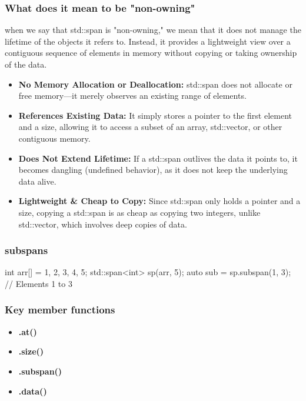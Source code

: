 \documentclass{report}
\begin{document}
         \subsubsection{What does it mean to be "non-owning"}
         \bigbreak \noindent 
         when we say that std::span is "non-owning," we mean that it does not manage the lifetime of the objects it refers to. Instead, it provides a lightweight view over a contiguous sequence of elements in memory without copying or taking ownership of the data.
         \bigbreak \noindent 
         \begin{itemize}
             \item \textbf{No Memory Allocation or Deallocation:} std::span does not allocate or free memory—it merely observes an existing range of elements.
             \item \textbf{References Existing Data:} It simply stores a pointer to the first element and a size, allowing it to access a subset of an array, std::vector, or other contiguous memory.
             \item \textbf{Does Not Extend Lifetime:} If a std::span outlives the data it points to, it becomes dangling (undefined behavior), as it does not keep the underlying data alive.
             \item \textbf{Lightweight \& Cheap to Copy:} Since std::span only holds a pointer and a size, copying a std::span is as cheap as copying two integers, unlike std::vector, which involves deep copies of data.
         \end{itemize}

         \bigbreak \noindent 
         \subsubsection{subspans}
         \bigbreak \noindent 
         \begin{cppcode}
             int arr[] = {1, 2, 3, 4, 5};
             std::span<int> sp(arr, 5);
             auto sub = sp.subspan(1, 3); // Elements 1 to 3
         \end{cppcode}
         \bigbreak \noindent 
         \subsubsection{Key member functions}
         \begin{itemize}
             \item \textbf{.at()}
             \item \textbf{.size()}
             \item \textbf{.subspan()}
             \item \textbf{.data()}
         \end{itemize}
\end{document}
